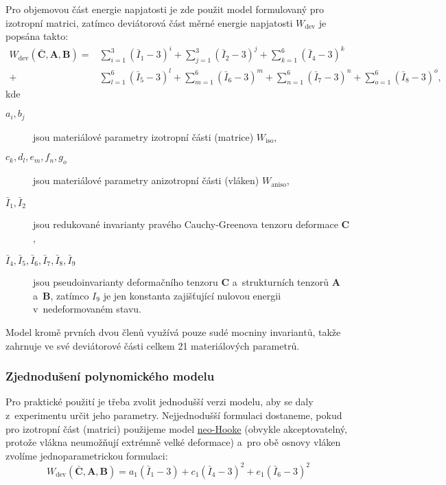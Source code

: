 Pro objemovou část energie napjatosti je zde použit model formulovaný pro izotropní matrici, zatímco deviátorová část měrné energie napjatosti $W_\text{dev}$ je popsána takto:
\begin{equation}\begin{split}
	W_\text{dev}(\bar{\bm{C}},\bm{A},\bm{B})
	= &\sum\limits_{i=1}^3 \left(\bar{I}_1 - 3\right)^i
	+ \sum\limits_{j=1}^3 \left(\bar{I}_2 - 3\right)^j
	+ \sum\limits_{k=1}^6 \left(\bar{I}_4 - 3\right)^k\\
	+ &\sum\limits_{l=1}^6 \left(\bar{I}_5 - 3\right)^l
	+ \sum\limits_{m=1}^6 \left(\bar{I}_6 - 3\right)^m
	+ \sum\limits_{n=1}^6 \left(\bar{I}_7 - 3\right)^n
	+ \sum\limits_{o=1}^6 \left(\bar{I}_8 - 3\right)^o,
\end{split}\end{equation}
kde
\begin{description}
	\item[$a_i, b_j$] jsou materiálové parametry izotropní části (matrice) $W_\text{iso}$,
	\item[$c_k, d_l, e_m, f_n, g_o$] jsou materiálové parametry anizotropní části (vláken) $W_\text{aniso}$,
	\item[$\bar{I}_1, \bar{I}_2$] jsou redukované invarianty pravého Cauchy-Greenova tenzoru deformace $\bm{C}$,
	\item[$\bar{I}_4, \bar{I}_5, \bar{I}_6, \bar{I}_7, \bar{I}_8, \bar{I}_9$] jsou pseudoinvarianty deformačního tenzoru $\bm{C}$ a~strukturních tenzorů $\bm{A}$ a~$\bm{B}$, zatímco $I_9$ je jen konstanta zajišťující nulovou energii v~nedeformovaném stavu.
\end{description}

Model kromě prvních dvou členů využívá pouze sudé mocniny invariantů, takže zahrnuje ve své deviátorové části celkem 21 materiálových parametrů.

\subsubsection{Zjednodušení polynomického modelu}
Pro praktické použití je třeba zvolit jednodušší verzi modelu, aby se daly z~experimentu určit jeho parametry.
Nejjednodušší formulaci dostaneme, pokud pro izotropní část (matrici) použijeme model \hyperref[sec:neo-hooke]{neo-Hooke} (obvykle akceptovatelný, protože  vlákna neumožňují extrémně velké deformace) a~pro obě osnovy vláken zvolíme jednoparametrickou formulaci:
\begin{equation}
	W_\text{dev}(\bar{\bm{C}},\bm{A},\bm{B})
	= a_1 \left(\bar{I}_1 - 3\right)
	+ c_1 \left(\bar{I}_4 - 3\right)^2
	+ e_1 \left(\bar{I}_6 - 3\right)^2
\end{equation}

